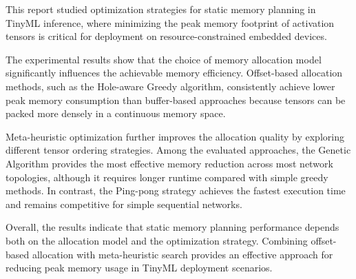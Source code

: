 \singlespacing  


This report studied optimization strategies for static memory planning in TinyML inference, 
where minimizing the peak memory footprint of activation tensors is critical for deployment 
on resource-constrained embedded devices.

The experimental results show that the choice of memory allocation model significantly 
influences the achievable memory efficiency. Offset-based allocation methods, such as the 
Hole-aware Greedy algorithm, consistently achieve lower peak memory consumption than 
buffer-based approaches because tensors can be packed more densely in a continuous 
memory space.

Meta-heuristic optimization further improves the allocation quality by exploring different 
tensor ordering strategies. Among the evaluated approaches, the Genetic Algorithm provides 
the most effective memory reduction across most network topologies, although it requires 
longer runtime compared with simple greedy methods. In contrast, the Ping-pong strategy 
achieves the fastest execution time and remains competitive for simple sequential networks.

Overall, the results indicate that static memory planning performance depends both on the 
allocation model and the optimization strategy. Combining offset-based allocation with 
meta-heuristic search provides an effective approach for reducing peak memory usage in 
TinyML deployment scenarios.